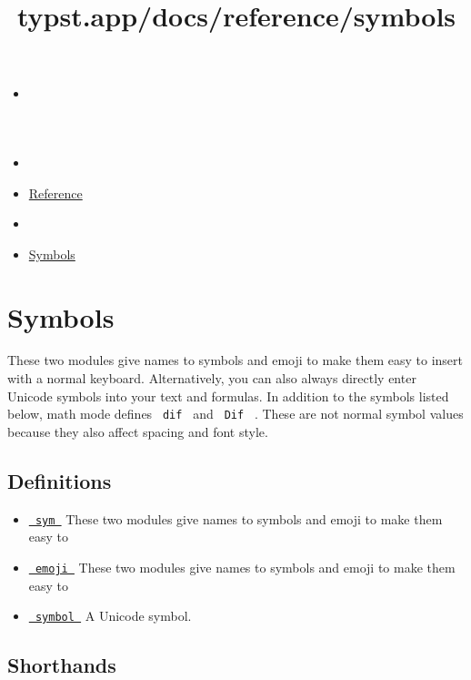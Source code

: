 \title{typst.app/docs/reference/symbols}

\begin{itemize}
\tightlist
\item
  \href{/docs}{}
\item
  
\item
  \href{/docs/reference/}{Reference}
\item
  
\item
  \href{/docs/reference/symbols/}{Symbols}
\end{itemize}

\section{Symbols}\label{summary}

These two modules give names to symbols and emoji to make them easy to
insert with a normal keyboard. Alternatively, you can also always
directly enter Unicode symbols into your text and formulas. In addition
to the symbols listed below, math mode defines \texttt{\ dif\ } and
\texttt{\ Dif\ } . These are not normal symbol values because they also
affect spacing and font style.

\subsection{Definitions}\label{definitions}

\begin{itemize}
\tightlist
\item
  \href{/docs/reference/symbols/sym/}{\texttt{\ sym\ }} { These two
  modules give names to symbols and emoji to make them easy to }
\item
  \href{/docs/reference/symbols/emoji/}{\texttt{\ emoji\ }} { These two
  modules give names to symbols and emoji to make them easy to }
\item
  \href{/docs/reference/symbols/symbol/}{\texttt{\ symbol\ }} { A
  Unicode symbol. }
\end{itemize}

\subsection{Shorthands}\label{shorthands}

